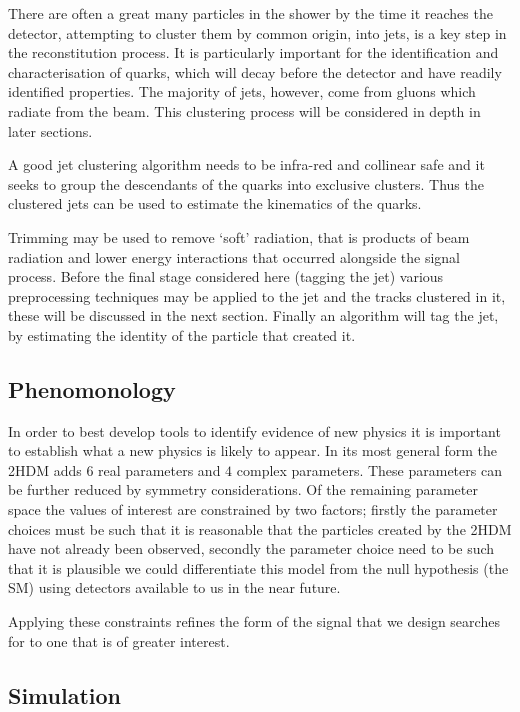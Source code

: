 There are often a great many particles in the shower by the time it reaches the detector,
attempting to cluster them by common origin,
into jets, is a key step in the reconstitution process.
It is particularly important for the identification and characterisation of quarks,
which will decay before the detector and have readily identified properties.
The majority of jets, however, come from gluons which radiate from the beam.
This clustering process will be considered in depth in later sections.

A good jet clustering algorithm needs to be infra-red and collinear safe  %
and it seeks to group the descendants of the quarks into exclusive clusters.
Thus the clustered jets can be used to estimate the kinematics of the quarks.

Trimming may be used to remove `soft' radiation, that is products of beam radiation and lower energy interactions that occurred alongside the signal process.
Before the final stage considered here (tagging the jet) various preprocessing techniques may be applied to the jet and the tracks clustered in it,
these will be discussed in the next section.
Finally an algorithm will tag the jet, by estimating the identity of the particle that created it.

\subsection{Phenomonology}
In order to best develop tools to identify evidence of new physics it is important to establish what
a new physics is likely to appear.
In its most general form the 2HDM adds \(6\) real parameters and \(4\) complex parameters.
These parameters can be further reduced by symmetry considerations.
Of the remaining parameter space the values of interest are constrained by two factors;
firstly the parameter choices must be such that it is reasonable that the particles created by the 2HDM
have not already been observed,
secondly the parameter choice need to be such that it is plausible we could differentiate
this model from the null hypothesis (the SM) using detectors available to us in the near future.

Applying these constraints refines the form of the signal that we design searches for to
one that is of greater interest.

\subsection{Simulation}

